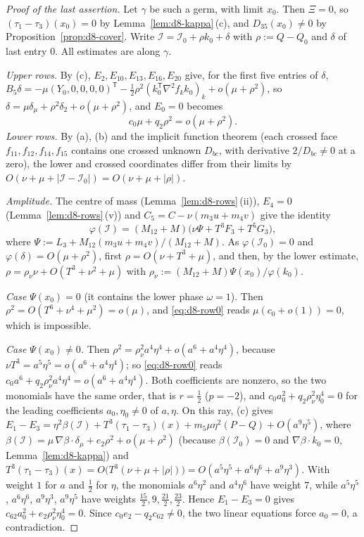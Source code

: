 \begin{proof}[Proof of the last assertion]
Let $\gamma$ be such a germ, with limit $x_0$.  Then $\Xi=0$, so $(\tau_1-\tau_3)(x_0)=0$ by
Lemma~\ref{lem:d8-kappa}\,(c), and $D_{35}(x_0)\ne0$ by Proposition~\ref{prop:d8-cover}.  Write
$\mathcal I=\mathcal I_0+\rho k_0+\delta$ with $\rho:=Q-Q_0$ and $\delta$ of last entry $0$.  All
estimates are along $\gamma$.

\emph{Upper rows.}  By (c), $E_2,E_{10},E_{13},E_{16},E_{20}$ give, for the first five entries
of $\delta$,
$B_5\delta=-\mu(Y_0,0,0,0,0)^{\mathsf T}-\frac12\rho^2(k_0^{\mathsf T}\nabla^2f_kk_0)_k
+o(\mu+\rho^2)$, so $\delta=\mu\delta_\mu+\rho^2\delta_2+o(\mu+\rho^2)$, and $E_0=0$ becomes
\begin{equation}\label{eq:d8-row0}
  c_0\mu+q_2\rho^2=o(\mu+\rho^2).
\end{equation}
\emph{Lower rows.}  By (a), (b) and the implicit function theorem (each crossed face
$f_{11},f_{12},f_{14},f_{15}$ contains one crossed unknown $D_{bc}$, with derivative
$2/D_{bc}\ne0$ at a zero), the lower and crossed coordinates differ from their limits by
$O(\nu+\mu+|\mathcal I-\mathcal I_0|)=O(\nu+\mu+|\rho|)$.

\emph{Amplitude.}  The centre of mass (Lemma~\ref{lem:d8-rows}\,(ii)), $E_4=0$
(Lemma~\ref{lem:d8-rows}\,(v)) and $C_5=C-\nu(m_3u+m_4v)$ give the identity
\[
  \varphi(\mathcal I)=(M_{12}+M)\bigl(\nu\Psi+T^3F_3+T^5G_3\bigr),
\]
where $\Psi:=L_3+M_{12}(m_3u+m_4v)/(M_{12}+M)$.
As $\varphi(\mathcal I_0)=0$ and $\varphi(\delta)=O(\mu+\rho^2)$, first $\rho=O(\nu+T^3+\mu)$,
and then, by the lower estimate, $\rho=\rho_\nu\nu+O(T^3+\nu^2+\mu)$ with
$\rho_\nu:=(M_{12}+M)\Psi(x_0)/\varphi(k_0)$.

\emph{Case $\Psi(x_0)=0$} (it contains the lower phase $\omega=1$).  Then
$\rho^2=O(T^6+\nu^4+\mu^2)=o(\mu)$, and \eqref{eq:d8-row0} reads $\mu(c_0+o(1))=0$, which is
impossible.

\emph{Case $\Psi(x_0)\ne0$.}  Then $\rho^2=\rho_\nu^2a^4\eta^4+o(a^6+a^4\eta^4)$, because
$\nu T^3=a^5\eta^5=o(a^6+a^4\eta^4)$; so \eqref{eq:d8-row0} reads
$c_0a^6+q_2\rho_\nu^2a^4\eta^4=o(a^6+a^4\eta^4)$.  Both coefficients are nonzero, so the two
monomials have the same order, that is $r=\frac12$ ($p=-2$), and
$c_0a_0^2+q_2\rho_\nu^2\eta_0^4=0$ for the leading coefficients $a_0,\eta_0\ne0$ of $a,\eta$.  On
this ray, (c) gives
$E_1-E_3=\eta^2\beta(\mathcal I)+T^3(\tau_1-\tau_3)(x)+m_5\mu\eta^2(P-Q)+O(a^9\eta^5)$, where
$\beta(\mathcal I)=\mu\,\nabla\beta\cdot\delta_\mu+e_2\rho^2+o(\mu+\rho^2)$ (because
$\beta(\mathcal I_0)=0$ and $\nabla\beta\cdot k_0=0$, Lemma~\ref{lem:d8-kappa}) and
$T^3(\tau_1-\tau_3)(x)=O\bigl(T^3(\nu+\mu+|\rho|)\bigr)=O(a^5\eta^5+a^6\eta^6+a^9\eta^3)$.  With
weight $1$ for $a$ and $\frac12$ for $\eta$, the monomials $a^6\eta^2$ and $a^4\eta^6$ have
weight $7$, while $a^5\eta^5$, $a^6\eta^6$, $a^9\eta^3$, $a^9\eta^5$ have weights
$\frac{15}2,9,\frac{21}2,\frac{23}2$.  Hence $E_1-E_3=0$ gives
$c_{62}a_0^2+e_2\rho_\nu^2\eta_0^4=0$.  Since $c_0e_2-q_2c_{62}\ne0$, the two linear equations
force $a_0=0$, a contradiction.
\end{proof}

